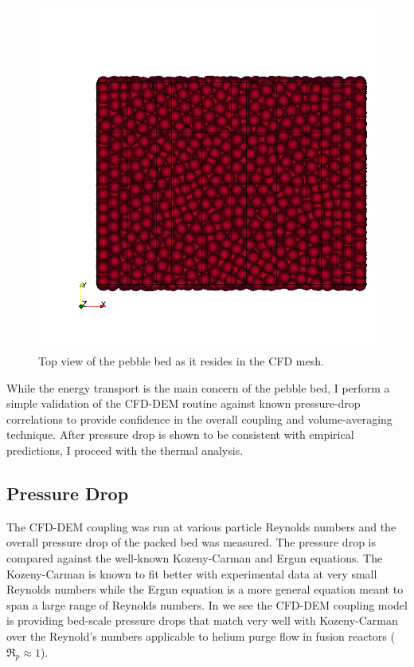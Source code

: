 \begin{figure}[t]
	\centering
	\includegraphics[width=\singleimagewidth]{figures/z-top-view}
    \caption{Top view of the pebble bed as it resides in the CFD mesh.}\label{fig:cfdem-domain-z}
\end{figure}


While the energy transport is the main concern of the pebble bed, I perform a simple validation of the CFD-DEM routine against known pressure-drop correlations to provide confidence in the overall coupling and volume-averaging technique. After pressure drop is shown to be consistent with empirical predictions, I proceed with the thermal analysis.
\FloatBarrier


\subsection{Pressure Drop}

The CFD-DEM coupling was run at various particle Reynolds numbers and the overall pressure drop of the packed bed was measured. The pressure drop is compared against the well-known Kozeny-Carman and Ergun equations. The Kozeny-Carman is known to fit better with experimental data at very small Reynolds numbers while the Ergun equation is a more general equation meant to span a large range of Reynolds numbers. In  we see the CFD-DEM coupling model is providing bed-scale pressure drops that match very well with Kozeny-Carman over the Reynold’s numbers applicable to helium purge flow in fusion reactors ($\Re_p \approx 1$). 


